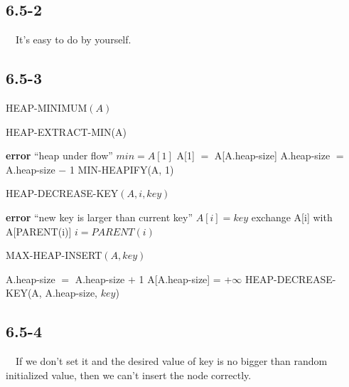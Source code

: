 \documentclass{article}
\begin{document}
\subsection*{6.5-2}
~~It's easy to do by yourself.

\subsection*{6.5-3}
\begin{algorithm}
\caption{HEAP-MINIMUM$(A)$}
\begin{algorithmic}[1]
\end{algorithmic}
\end{algorithm}

\begin{algorithm}
\caption{HEAP-EXTRACT-MIN(A)}
\begin{algorithmic}[1]
\STATE \textbf{error} ``heap under flow''
\ENDIF
\STATE $min = A[1]$
\STATE A[1] $=$ A[A.heap-size]
\STATE A.heap-size $=$ A.heap-size $-$ 1
\STATE MIN-HEAPIFY(A, 1)
\end{algorithmic}
\end{algorithm}

\begin{algorithm}
\caption{HEAP-DECREASE-KEY$(A, i, key)$}
\begin{algorithmic}[1]
\STATE \textbf{error} ``new key is larger than current key''
\ENDIF
\STATE $A[i] = key$
\STATE exchange A[i] with A[PARENT(i)]
\STATE $i = PARENT(i)$
\ENDWHILE
\end{algorithmic}
\end{algorithm}

\begin{algorithm}
\caption{MAX-HEAP-INSERT$(A, key)$}
\begin{algorithmic}[1]
\STATE A.heap-size $=$ A.heap-size $+$ 1
\STATE A[A.heap-size] = +$\infty$
\STATE HEAP-DECREASE-KEY(A, A.heap-size, $key$)
\end{algorithmic}
\end{algorithm}

\subsection*{6.5-4}
~~If we don't set it and the desired value of key is no bigger than random initialized value, then we can't insert the node correctly.
\end{document}
